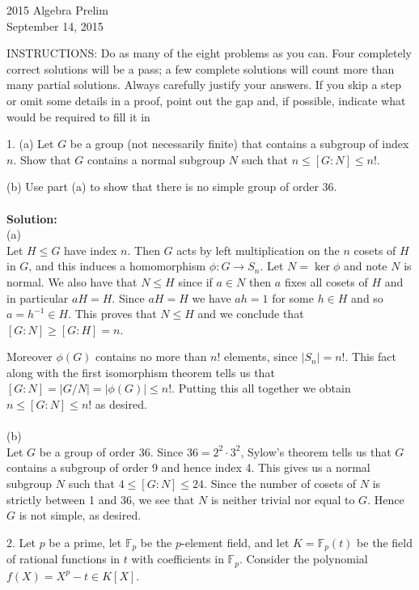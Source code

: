 \documentclass[11pt]{article}
\newcommand{\F}{\mathbb{F}}
\begin{document}
\begin{center}
\Large 2015 Algebra Prelim\\
\normalsize September 14, 2015
\end{center}
\vspace{1em}

INSTRUCTIONS: Do as many of the eight problems as you can. Four completely
correct solutions will be a pass; a few complete solutions will count more than many
partial solutions. Always carefully justify your answers. If you skip a step or omit
some details in a proof, point out the gap and, if possible, indicate what would be
required to fill it in\\
\vspace{1em}


1. (a) Let $G$ be a group (not necessarily finite) that contains a subgroup of index $n$.
Show that $G$ contains a normal subgroup $N$ such that $n \le  [G : N] \le  n!$.

(b) Use part (a) to show that there is no simple group of order 36.\\\\
\textbf{Solution:}\\
(a)\\
Let $H\le G$ have index $n$. Then $G$ acts by left multiplication on the $n$ cosets of $H$ in $G$, and this induces a homomorphism $\phi:G\to S_n$. Let $N = \ker\phi$ and note $N$ is normal.  We also have that $N\le H$ since if $a\in N$ then $a$ fixes all cosets of $H$ and in particular  $aH = H$. Since $aH = H$ we have $ah = 1$ for some $h\in H$ and so $a=h^{-1}\in H$. This proves that $N\le H$ and we conclude that $[G:N] \ge [G:H] = n$. 

Moreover $\phi(G)$ contains no more than $n!$ elements, since $|S_n| = n!$. This fact along with the first isomorphism theorem tells us that $[G:N] = |G/N| = |\phi(G)| \le n!$. Putting this all together we obtain $n\le [G:N]\le n!$ as desired. 
  \\\\
(b)\\
Let $G$ be a group of order 36. Since $36 = 2^2\cdot 3^2$, Sylow's theorem tells us that $G$ contains a subgroup of order 9 and hence index 4. This gives us a normal subgroup $N$ such that $4\le [G:N]\le 24$. Since the number of cosets of $N$ is strictly between 1 and 36, we see that $N$ is neither trivial nor equal to $G$. Hence $G$ is not simple, as desired.
\newpage

2. Let $p$ be a prime, let $\F_p$ be the $p$-element field, and let $K = \F_p(t)$ be the field of rational
functions in $t$ with coefficients in $\F_p$. Consider the polynomial $f(X) = X^p - t \in K[X]$.
\end{document}
